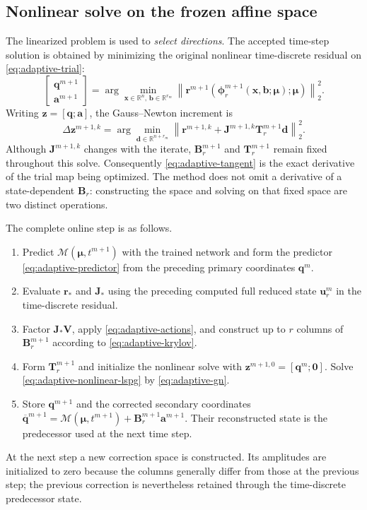 \documentclass[11pt]{article}
\newcommand{\q}{\mathbf q}
\newcommand{\qbar}{\overline{\mathbf q}}
\newcommand{\uvec}{\mathbf u}
\newcommand{\mub}{\bm\mu}
\newcommand{\norm}[1]{\left\lVert #1 \right\rVert}
\begin{document}
\subsection{Nonlinear solve on the frozen affine space}
The linearized problem is used to \emph{select directions}.  The accepted
time-step solution is obtained by minimizing the original nonlinear
time-discrete residual on \eqref{eq:adaptive-trial}:
\begin{equation}
\begin{bmatrix}\q^{m+1}\\\mathbf a^{m+1}\end{bmatrix}
=\arg\min_{\mathbf x\in\mathbb R^n,\,\mathbf b\in\mathbb R^{r_m}}
\norm{\mathbf r^{m+1}
(\boldsymbol\phi_r^{m+1}(\mathbf x,\mathbf b;\mub);\mub)}_2^2.
\label{eq:adaptive-nonlinear-lspg}
\end{equation}
Writing $\mathbf z=[\q;\mathbf a]$, the Gauss--Newton increment is
\begin{equation}
\Delta\mathbf z^{m+1,k}
=\arg\min_{\mathbf d\in\mathbb R^{n+r_m}}
\norm{\mathbf r^{m+1,k}+
\mathbf J^{m+1,k}\mathbf T_r^{m+1}\mathbf d}_2^2.
\label{eq:adaptive-gn}
\end{equation}
Although $\mathbf J^{m+1,k}$ changes with the iterate,
$\mathbf B_r^{m+1}$ and $\mathbf T_r^{m+1}$ remain fixed throughout
this solve.  Consequently \eqref{eq:adaptive-tangent} is the exact
derivative of the trial map being optimized.  The method does not omit a
derivative of a state-dependent $\mathbf B_r$: constructing the space and
solving on that fixed space are two distinct operations.

The complete online step is as follows.
\begin{enumerate}
\item Predict $\mathcal M(\mub,t^{m+1})$ with the trained network and form
the predictor \eqref{eq:adaptive-predictor} from the preceding primary
coordinates $\q^m$.
\item Evaluate $\mathbf r_*$ and $\mathbf J_*$ using the preceding
computed full reduced state $\uvec_r^m$ in the time-discrete residual.
\item Factor $\mathbf J_*\mathbf V$, apply
\eqref{eq:adaptive-actions}, and construct up to $r$ columns of
$\mathbf B_r^{m+1}$ according to \eqref{eq:adaptive-krylov}.
\item Form $\mathbf T_r^{m+1}$ and initialize the nonlinear solve with
$\mathbf z^{m+1,0}=[\q^m;\mathbf0]$.  Solve
\eqref{eq:adaptive-nonlinear-lspg} by \eqref{eq:adaptive-gn}.
\item Store $\q^{m+1}$ and the corrected secondary coordinates
$\qbar^{m+1}=\mathcal M(\mub,t^{m+1})+
\mathbf B_r^{m+1}\mathbf a^{m+1}$.  Their reconstructed state is the
predecessor used at the next time step.
\end{enumerate}
At the next step a new correction space is constructed.  Its amplitudes
are initialized to zero because the columns generally differ from those at
the previous step; the previous correction is nevertheless retained through
the time-discrete predecessor state.
\end{document}
